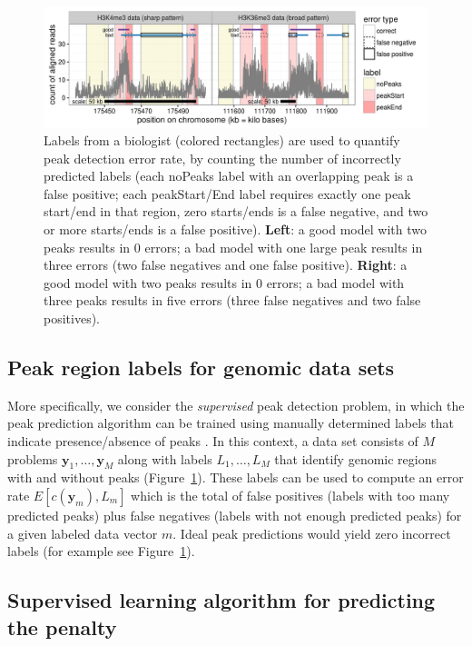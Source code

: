 \documentclass[twoside,11pt]{article}
\begin{document}
\begin{figure}[t!]
  \centering
  \includegraphics[width=\textwidth]{figure-good-bad}
\vskip -0.5cm
\caption{Labels from a biologist (colored rectangles) are used to 
  quantify peak detection error rate, by counting the
  number of incorrectly predicted labels
  (each noPeaks label with an overlapping
  peak is a false positive; each peakStart/End label requires exactly
  one peak start/end in that region, zero starts/ends is a false
  negative, and two or more starts/ends is a false positive).
  \textbf{Left}: a \textcolor{good}{good} model with two peaks results in 0 errors; a
  \textcolor{bad}{bad} model with one large peak results in three errors (two false negatives and one false positive).
  \textbf{Right}: a \textcolor{good}{good} model with two peaks results in 0 errors; a
  \textcolor{bad}{bad} model with three peaks results in five errors (three false negatives and two false positives).
}
  \label{fig:good-bad}
\end{figure}

\subsection{Peak region labels for genomic data sets}

More specifically, we consider the \emph{supervised} peak detection problem,
in which the peak prediction algorithm can be trained using manually
determined labels that indicate presence/absence of peaks
\citep{HOCKING2016-chipseq}. In this context, a data set
consists of $M$ problems $\mathbf y_1,\dots,\mathbf y_M$
along with labels $L_1,\dots, L_M$ that identify genomic regions with
and without peaks (Figure~\ref{fig:good-bad}). 
These labels can be
used to compute an error rate $E[c(\mathbf y_m), L_m]$ which is the
total of false positives (labels with too many predicted peaks) plus
false negatives (labels with not enough predicted peaks) for a given
labeled data vector $m$. Ideal peak predictions would yield zero
incorrect labels (for example see Figure~\ref{fig:good-bad}).


\subsection{Supervised learning algorithm 
for predicting the penalty}
\label{sec:supervised}
\end{document}

